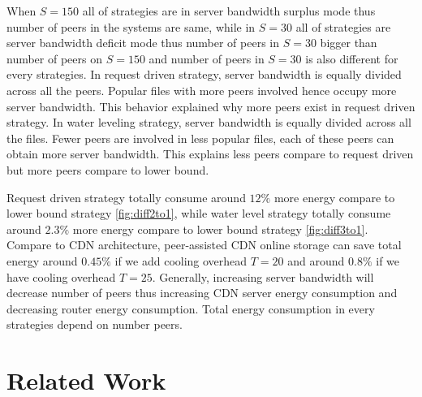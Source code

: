 \documentclass[JIP]{ipsj}
\begin{document}
When $S=150$ all of strategies are in server bandwidth surplus mode thus number of peers in the systems are same, while in $S=30$ all of strategies are server bandwidth deficit mode thus number of peers in $S=30$ bigger than number of peers on $S=150$ and number of peers in $S=30$ is also different for every strategies. 
In request driven strategy, server bandwidth is equally divided across all the peers. 
Popular files with more peers involved hence occupy more server bandwidth. 
This behavior explained why more peers exist in request driven strategy.
In water leveling strategy, server bandwidth is equally divided across all the files.  
Fewer peers are involved in less popular files, each of these peers can obtain more server bandwidth.  
This explains less peers compare to request driven but more peers compare to lower bound.

Request driven strategy totally consume around $12\%$ more energy compare to lower bound strategy \ref{fig:diff2to1}, while water level strategy totally consume around $2.3\%$ more energy compare to lower bound strategy \ref{fig:diff3to1}.
Compare to CDN architecture, peer-assisted CDN online storage can save total energy around $0.45\%$ if we add cooling overhead $T=20$ and around $0.8\%$ if we have cooling overhead $T=25$.
Generally, increasing server bandwidth will decrease number of peers thus increasing CDN server energy consumption and decreasing router energy consumption. 
Total energy consumption in every strategies depend on number peers.  


\section{Related Work} 
\end{document}
